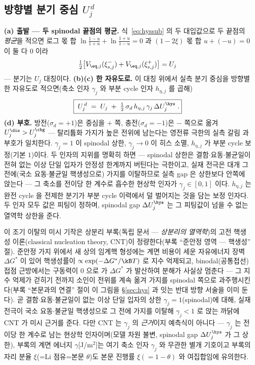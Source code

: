 \subsection{방향별 분기 중심 $U_j^{\,d}$}\label{sec:hys-branch}
\textbf{(a) 출발 --- 두 spinodal 끝점의 평균.} 식~\eqref{eq:hyssub} 의 두 대입값으로 두 끝점의 \emph{평균}을 적으면
로그 몫 합 $\ln\frac{1-u}{1+u}+\ln\frac{1+u}{1-u}=0$ 과 $(1-2\xi)$ 몫 합 $u+(-u)=0$ 이 둘 다 $0$ 이라
\begin{equation}
\tfrac12\big[V_{\eq,j}(\xi_{s,j}^-)+V_{\eq,j}(\xi_{s,j}^+)\big]=U_j
\label{eq:hyssym}
\end{equation}
--- 분기는 $U_j$ 대칭이다. \textbf{(b)(c) 한 자유도로.} 이 대칭 위에서 실측 분기 중심을 방향별 한 자유도로 적으면(축소
인자 $\gamma_j$ 와 부분 cycle 인자 $h_{\eta,j}$ 를 곱해)
\begin{equation}
\boxed{\;U_j^{\,d}\;=\;U_j\;+\;\tfrac12\,\sigma_d\,h_{\eta,j}\,\gamma_j\,\Delta U_j^\hys\;.}
\label{eq:Ubranch}
\end{equation}
\textbf{(d) 부호.} 방전($\sigma_d=+1$)은 중심을
$+$ 쪽, 충전($\sigma_d=-1$)은 $-$ 쪽으로 옮겨 $U_j^{\dis}>U_j^{\chg}$ --- 탈리튬화 가지가 높은 전위에
남는다는 영전류 극한의 실측 갈림\cite{dreyer2010} 과 부호가 일치한다.
$\gamma_j=1$ 이 spinodal 상한, $\gamma_j\to0$ 이 히스 소멸, $h_{\eta,j}$ 가 부분 cycle 보정(기본 $1$)이다.
두 인자의 지위를 명확히 하면 --- spinodal 상한은 결함$\cdot$요동$\cdot$불균일이 전혀 없는 이상 단일 입자가
안정성 한계까지 버틴다는 극한이고, 실재 전극은 대개 그 전에(국소 요동$\cdot$불균일 핵생성으로) 가지를
이탈하므로 실측 gap 은 상한보다 안쪽에 앉는다 --- 그 축소를 전이당 한 계수로 흡수한 현상학 인자가
$\gamma_j\in[0,1]$ 이다. $h_{\eta,j}$ 는 완전 cycle 을 전제한 분기가 부분 cycle 이력에서 덜 벌어지는 것을
담는 보정 인자다. 두 인자 모두 값은 피팅이 정하며, spinodal gap $\Delta U_j^\hys$ 는 그 피팅값이 넘을 수
없는 열역학 상한을 준다.

이 조기 이탈의 미시 기작은 상분리 부록(독립 문서 --- \emph{상분리의 열역학})의 고전 핵생성
이론(classical nucleation theory, CNT)이 정량한다(부록 ``준안정 영역 --- 핵생성'' 절). 준안정
가지 위에서 새 상의 임계핵 형성에는 계면 비용이 세운 자유에너지 장벽 $\Delta G^\ast$ 이 있어
핵생성률이 $\propto\exp(-\Delta G^\ast/\kB T)$ 로 지수 억제되고, binodal(공통접선) 접점 근방에서는
구동력이 $0$ 으로 가 $\Delta G^\ast$ 가 발산하여 분해가 사실상 멈춘다 --- 그 지수 억제가 걷히기
전까지 소인이 전위를 계속 옮겨 가지를 spinodal 쪽으로 과주행시킨다(부록 ``본문과의 연결'' 절이 이
그림을 \S\ref{sec:hys} 과 잇는 반대 방향 서술을 이미 둔다). 곧 결함$\cdot$요동$\cdot$불균일이 없는
이상 단일 입자의 상한 $\gamma_j=1$(spinodal)에 대해, 실재 전극이 국소 요동$\cdot$불균일 핵생성으로
그 전에 가지를 이탈해 $\gamma_j<1$ 로 앉는 까닭에 CNT 가 미시 근거를 준다. 다만 CNT 는 $\gamma_j$ 의
\emph{근거}이지 예측식이 아니다 --- $\gamma_j$ 는 전이당 한 계수로 남는 현상학 인자이며(모델 차원
불변, spinodal gap $\Delta U_j^\hys$ 가 그 상한), 부록의 계면 에너지 $\gamma$[J/m$^2$]는 여기 축소
인자 $\gamma_j$ 와 무관한 별개 기호이고 부록의 자리 분율 $\xi$(=Li 점유=본문 $\theta$)도 본문 진행률
$\xi(=1-\theta)$ 와 여집합임에 유의한다.

